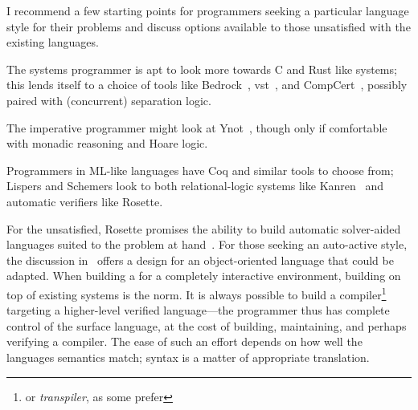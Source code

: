 I recommend a few starting points for programmers seeking a particular language
style for their problems and discuss options available to those unsatisfied with
the existing languages.

The systems programmer is apt to look more towards C and Rust like systems; this
lends itself to a choice of tools like Bedrock~\cite{Chlipala_2011},
\gls{vst}~\cite{VST}, and CompCert~\cite{Kastner-LBSSF-2017}, possibly paired
with (concurrent) separation logic.

The imperative programmer might look at Ynot~\cite{Nanevski08ynot:reasoning},
though only if comfortable with monadic reasoning and Hoare logic.

Programmers in ML-like languages have Coq and similar tools to choose from;
Lispers and Schemers look to both relational-logic systems like
Kanren~\cite{Byrd_2009} and automatic verifiers like Rosette.

For the unsatisfied, Rosette promises the ability to build automatic
solver-aided languages suited to the problem at hand~\cite{Torlak_2013}. For
those seeking an auto-active style, the discussion
in~\cite{leino2008specification} offers a design for an object-oriented language
that could be adapted. When building a for a completely interactive environment,
building on top of existing systems is the norm. It is always possible to build
a compiler\footnote{or \emph{transpiler}, as some prefer} targeting a
higher-level verified language---the programmer thus has complete control of the
surface language, at the cost of building, maintaining, and perhaps verifying a
compiler. The ease of such an effort depends on how well the languages semantics
match; syntax is a matter of appropriate translation.

